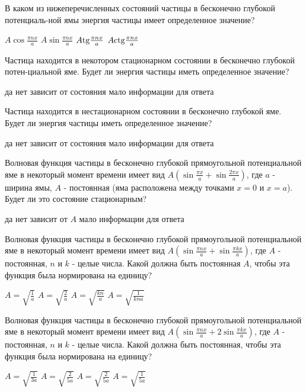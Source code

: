 \documentclass[11pt,a4paper]{exam}
\begin{document}
\begin{questions}
\question В каком из нижеперечисленных состояний частицы в бесконечно глубокой потенциаль-ной ямы энергия частицы имеет определенное значение?
\begin{choices}
\choice $A\cos \frac{{\pi nx}}{a}$    
\choice $A\sin \frac{{\pi nx}}{a}$    
\choice $A{\rm{tg}}\frac{{\pi nx}}{a}$      
\choice $A{\rm{ctg}}\frac{{\pi nx}}{a}$
\end{choices}

\question Частица находится в некотором стационарном состоянии в бесконечно глубокой потен-циальной яме. Будет ли энергия частицы иметь определенное значение?
\begin{choices}
\choice да             
\choice нет
\choice зависит от состояния    
\choice мало информации для ответа
\end{choices}

\question Частица находится в нестационарном состоянии в бесконечно глубокой яме. Будет ли энергия частицы иметь определенное значение?
\begin{choices}
\choice да             
\choice нет 
\choice зависит от состояния    
\choice мало информации для ответа 
\end{choices}

\question Волновая функция частицы в бесконечно глубокой прямоугольной потенциальной яме в некоторый момент времени имеет вид $A\left( {\sin \frac{{\pi x}}{a} + \sin \frac{{2\pi x}}{a}} \right)$, где $a$ - ширина ямы, $A$ - постоянная (яма расположена между точками $x = 0$ и $x = a$). Будет ли это состояние стационарным?
\begin{choices}
\choice да    
\choice нет      
\choice зависит от $A$    
\choice мало информации для ответа
\end{choices}

\question Волновая функция частицы в бесконечно глубокой прямоугольной потенциальной яме в некоторый момент времени имеет вид $A\left( {\sin \frac{{\pi nx}}{a} + \sin \frac{{\pi kx}}{a}} \right)$, где $A$ - постоянная, $n$ и $k$ - целые числа. Какой должна быть постоянная $A$, чтобы эта функция была нормирована на единицу?
\begin{choices}
\choice $A = \sqrt {\frac{1}{a}} $    
\choice $A = \sqrt {\frac{2}{a}} $    
\choice $A = \sqrt {\frac{{kn}}{a}} $    
\choice $A = \sqrt {\frac{1}{{kna}}} $
\end{choices}

\question Волновая функция частицы в бесконечно глубокой прямоугольной потенциальной яме в некоторый момент времени имеет вид $A\left( {\sin \frac{{\pi nx}}{a} + 2\sin \frac{{\pi kx}}{a}} \right)$, где $A$ - постоянная, $n$ и $k$ - целые числа. Какой должна быть постоянная, чтобы эта функция была нормирована на единицу?
\begin{choices}
\choice $A = \sqrt {\frac{1}{{3a}}} $    
\choice $A = \sqrt {\frac{2}{{5a}}} $    
\choice $A = \sqrt {\frac{2}{{5a}}} $    
\choice $A = \sqrt {\frac{1}{{5a}}} $
\end{choices}


\end{questions}
\end{document}
